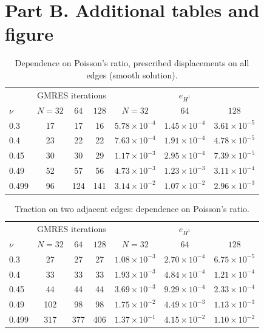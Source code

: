 \documentclass[11pt]{article}
\begin{document}
\fi

\clearpage
\section*{Part B. Additional tables and figure}
\begin{table}[htbp]\centering\small
\caption{Dependence on Poisson's ratio, prescribed displacements on all edges (smooth solution).}
\begin{tabular}{l ccc ccc}
\toprule
& \multicolumn{3}{c}{GMRES iterations} & \multicolumn{3}{c}{$e_{H^1}$}\\
$\nu$ & $N=32$ & $64$ & $128$ & $N=32$ & $64$ & $128$\\
\midrule
0.3 & 17 & 17 & 16 & $5.78{\times}10^{-4}$ & $1.45{\times}10^{-4}$ & $3.61{\times}10^{-5}$\\
0.4 & 23 & 22 & 22 & $7.63{\times}10^{-4}$ & $1.91{\times}10^{-4}$ & $4.78{\times}10^{-5}$\\
0.45 & 30 & 30 & 29 & $1.17{\times}10^{-3}$ & $2.95{\times}10^{-4}$ & $7.39{\times}10^{-5}$\\
0.49 & 52 & 57 & 56 & $4.73{\times}10^{-3}$ & $1.23{\times}10^{-3}$ & $3.11{\times}10^{-4}$\\
0.499 & 96 & 124 & 141 & $3.14{\times}10^{-2}$ & $1.07{\times}10^{-2}$ & $2.96{\times}10^{-3}$\\
\bottomrule
\end{tabular}
\end{table}

\begin{table}[htbp]\centering\small
\caption{Traction on two adjacent edges: dependence on Poisson's ratio.}
\begin{tabular}{l ccc ccc}
\toprule
& \multicolumn{3}{c}{GMRES iterations} & \multicolumn{3}{c}{$e_{H^1}$}\\
$\nu$ & $N=32$ & $64$ & $128$ & $N=32$ & $64$ & $128$\\
\midrule
0.3 & 27 & 27 & 27 & $1.08{\times}10^{-3}$ & $2.70{\times}10^{-4}$ & $6.75{\times}10^{-5}$\\
0.4 & 33 & 33 & 33 & $1.93{\times}10^{-3}$ & $4.84{\times}10^{-4}$ & $1.21{\times}10^{-4}$\\
0.45 & 44 & 44 & 44 & $3.69{\times}10^{-3}$ & $9.29{\times}10^{-4}$ & $2.33{\times}10^{-4}$\\
0.49 & 102 & 98 & 98 & $1.75{\times}10^{-2}$ & $4.49{\times}10^{-3}$ & $1.13{\times}10^{-3}$\\
0.499 & 317 & 377 & 406 & $1.37{\times}10^{-1}$ & $4.15{\times}10^{-2}$ & $1.10{\times}10^{-2}$\\
\bottomrule
\end{tabular}
\end{table}
\end{document}
